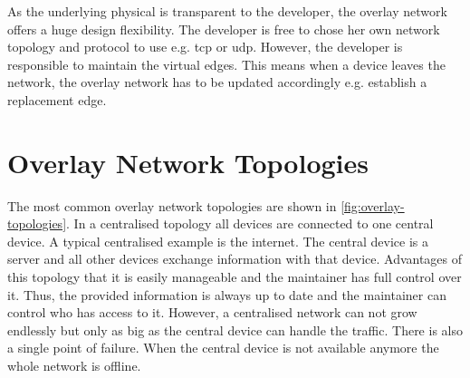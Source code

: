 As the underlying physical is transparent to the developer, the overlay network offers a huge design flexibility. The developer is free to chose her own network topology and protocol to use e.g. \gls{tcp} or \gls{udp}. However, the developer is responsible to maintain the virtual edges. This means when a device leaves the network, the overlay network has to be updated accordingly e.g. establish a replacement edge.

\section{Overlay Network Topologies}
The most common overlay network topologies are shown in \cref{fig:overlay-topologies}. In a centralised topology all devices are connected to one central device. A typical centralised example is the internet. The central device is a server and all other devices exchange information with that device. Advantages of this topology that it is easily manageable and the maintainer has full control over it. Thus, the provided information is always up to date and the maintainer can control who has access to it. However, a centralised network can not grow endlessly but only as big as the central device can handle the traffic. There is also a single point of failure. When the central device is not available anymore the whole network is offline.


